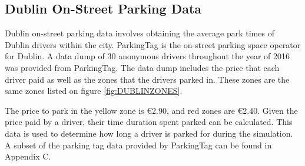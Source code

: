 \subsection{Dublin On-Street Parking Data}\label{ssec:on-street_parking_data}
Dublin on-street parking data involves obtaining the average park times of Dublin drivers within the city. ParkingTag is the on-street parking space operator for Dublin. A data dump of 30 anonymous drivers throughout the year of 2016 was provided from ParkingTag. The data dump includes the price that each driver paid as well as the zones that the drivers parked in. These zones are the same zones listed on figure \ref{fig:DUBLINZONES}.

The price to park in the yellow zone is €2.90, and red zones are €2.40. Given the price paid by a driver, their time duration spent parked can be calculated. This data is used to determine how long a driver is parked for during the simulation. A subset of the parking tag data provided by ParkingTag can be found in Appendix C.
